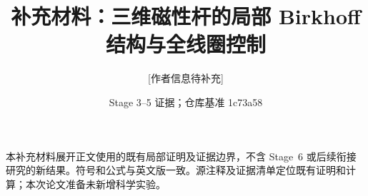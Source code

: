 \documentclass[11pt,a4paper]{article}
\title{补充材料：三维磁性杆的局部 Birkhoff 结构与全线圈控制}
\author{[作者信息待补充]}
\date{Stage 3--5 证据；仓库基准 1c73a58}
\begin{document}
\maketitle
\noindent 本补充材料展开正文使用的既有局部证明及证据边界，不含 Stage~6 或后续衔接研究的新结果。符号和公式与英文版一致。源注释及证据清单定位既有证明和计算；本次论文准备未新增科学实验。
\tableofcontents





\end{document}
